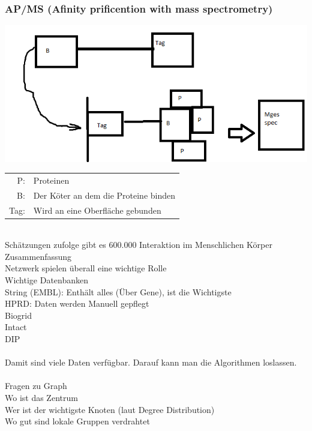 \documentclass{article}
\begin{document}
\subsubsection{AP/MS (Afinity prificention with mass spectrometry)}
\includegraphics[scale=0.5]{APMS}\\
\begin{tabular}{r l}
P:&Proteinen\\
B:&Der Köter an dem die Proteine binden\\
Tag:&Wird an eine Oberfläche gebunden\\
\end{tabular}
\\

Schätzungen zufolge gibt es 600.000 Interaktion im Menschlichen Körper\\

Zusammenfassung\\
Netzwerk spielen überall eine wichtige Rolle\\

Wichtige Datenbanken\\
String (EMBL): Enthält alles (Über Gene), ist die Wichtigste\\
HPRD: Daten werden Manuell gepflegt\\
Biogrid\\
Intact\\
DIP\\
\\

Damit sind viele Daten verfügbar. Darauf kann man die Algorithmen loslassen.\\
\\

Fragen zu Graph\\
Wo ist das Zentrum\\
Wer ist der wichtigste Knoten (laut Degree Distribution)\\
Wo gut sind lokale Gruppen verdrahtet\\
\\
\end{document}
